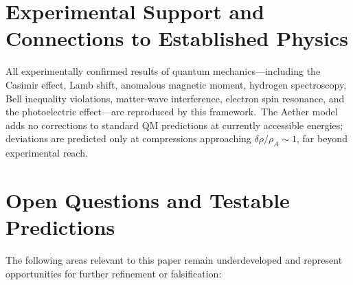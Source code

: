﻿\documentclass[12pt,letterpaper]{article}
\newcommand{\rhoa}{\rho_{\!A}}
\begin{document}
\section{Experimental Support and Connections to Established Physics}

All experimentally confirmed results of quantum mechanics---including the
Casimir effect, Lamb shift, anomalous magnetic moment, hydrogen spectroscopy,
Bell inequality violations, matter-wave interference, electron spin resonance,
and the photoelectric effect---are reproduced by this framework.\ The Aether
model adds no corrections to standard QM predictions at currently accessible
energies; deviations are predicted only at compressions approaching
$\delta\rho/\rhoa \sim 1$, far beyond experimental reach.


\section{Open Questions and Testable Predictions}

The following areas relevant to this paper remain underdeveloped and represent opportunities for further refinement or falsification:
\end{document}
